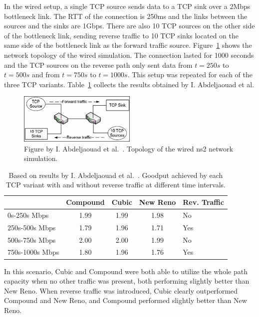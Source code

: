 In the wired setup, a single TCP source sends data to a TCP sink over a 2Mbps bottleneck link. The RTT of the connection is 250ms and the links between the sources and the sinks are 1Gbps. There are also 10 TCP sources on the other side of the bottleneck link, sending reverse traffic to 10 TCP sinks located on the same side of the bottleneck link as the forward traffic source. Figure~\ref{fig:topology1} shows the network topology of the wired simulation. The connection lasted for 1000 seconds and the TCP sources on the reverse path only sent data from $t=250s$ to $t=500s$ and from $t=750s$ to $t=1000s$. This setup was repeated for each of the three TCP variants. Table~\ref{tab:goodput1} collects the results obtained by  I. Abdeljaouad et al.

\begin{figure}
	\includegraphics[width=0.5\textwidth]{images/abdeljaouad10_topology_1.png}
	\caption{Figure by I. Abdeljaouad et al.~\cite{Abdeljaouad10}. Topology of the wired ns2 network simulation.}
	\label{fig:topology1}
\end{figure}

\begin{table}
\small
\begin{tabular}{l*{3}{c}l}
& Compound & Cubic & New Reno & Rev. Traffic \\
\hline
0s-250s Mbps & 1.99 & 1.99 & 1.98 & No \\
250s-500s Mbps & 1.79 & 1.96 & 1.71 & Yes \\
500s-750s Mbps & 2.00 & 2.00 & 1.99 & No \\
750s-1000s Mbps & 1.80 & 1.96 & 1.76 & Yes \\
\end{tabular}
\caption{Based on results by I. Abdeljaouad et al.~\cite{Abdeljaouad10}. Goodput achieved by each TCP variant with and without reverse traffic at different time intervals.}
\label{tab:goodput1}
\end{table}

In this scenario, Cubic and Compound were both able to utilize the whole path capacity when no other traffic was present, both performing slightly better than New Reno. When reverse traffic was introduced, Cubic clearly outperformed Compound and New Reno, and Compound performed slightly better than New Reno.  

